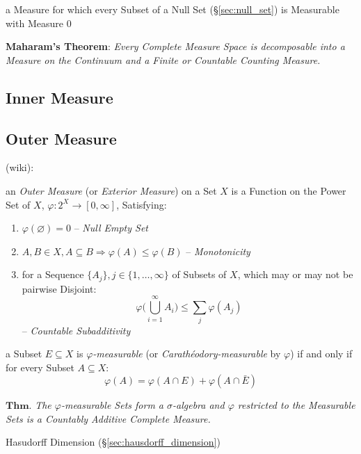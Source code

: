 a Measure for which every Subset of a Null Set (\S\ref{sec:null_set}) is
Measurable with Measure $0$

\textbf{Maharam's Theorem}: \emph{
  Every Complete Measure Space is decomposable into a Measure on the Continuum
  and a Finite or Countable Counting Measure.
}



\subsection{Inner Measure}\label{sec:inner_measure}

\subsection{Outer Measure}\label{sec:outer_measure}

(wiki):

an \emph{Outer Measure} (or \emph{Exterior Measure}) on a Set $X$ is a Function
on the Power Set of $X$, $\varphi : 2^X \rightarrow [0, \infty]$, Satisfying:
\begin{enumerate}
  \item $\varphi(\varnothing) = 0$ -- \emph{Null Empty Set}
  \item $A,B \in X, A \subseteq B \Rightarrow \varphi(A) \leq \varphi(B)$ --
    \emph{Monotonicity}
  \item for a Sequence $\{A_j\}, j \in \{1, \ldots, \infty\}$ of Subsets of $X$,
    which may or may not be pairwise Disjoint:
    \[
      \varphi\Big(\bigcup_{i=1}^\infty A_i\Big) \leq \sum_j\varphi(A_j)
    \]
    -- \emph{Countable Subadditivity}
\end{enumerate}

a Subset $E \subseteq X$ is \emph{$\varphi$-measurable} (or
\emph{Carath\'eodory-measurable} by $\varphi$) if and only if for every Subset
$A \subseteq X$:
\[
  \varphi(A) = \varphi(A \cap E) + \varphi(A \cap \bar{E})
\]

$\textbf{Thm.}$ \emph{
  The $\varphi$-measurable Sets form a $\sigma$-algebra and $\varphi$ restricted
  to the Measurable Sets is a Countably Additive Complete Measure.
}

Hasudorff Dimension (\S\ref{sec:hausdorff_dimension})



